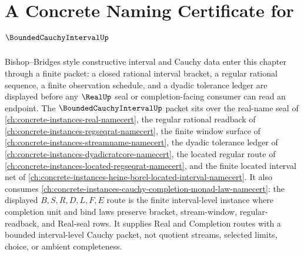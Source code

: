 \chapter{A Concrete Naming Certificate for $\BoundedCauchyIntervalUp$}
\label{ch:concrete-instances-bounded-cauchy-interval-namecert}

Bishop--Bridges style constructive interval and Cauchy data enter this chapter through a finite packet: a closed rational interval bracket, a regular rational sequence, a finite observation schedule, and a dyadic tolerance ledger are displayed before any $\RealUp$ seal or completion-facing consumer can read an endpoint. The $\BoundedCauchyIntervalUp$ packet sits over the real-name seal of \autoref{ch:concrete-instances-real-namecert}, the regular rational readback of \autoref{ch:concrete-instances-regseqrat-namecert}, the finite window surface of \autoref{ch:concrete-instances-streamname-namecert}, the dyadic tolerance ledger of \autoref{ch:concrete-instances-dyadicratcore-namecert}, the located regular route of \autoref{ch:concrete-instances-located-regseqrat-namecert}, and the finite located interval net of \autoref{ch:concrete-instances-heine-borel-located-interval-namecert}. It also consumes \autoref{ch:concrete-instances-cauchy-completion-monad-law-namecert}: the displayed $B,S,R,D,L,F,E$ route is the finite interval-level instance where completion unit and bind laws preserve bracket, stream-window, regular-readback, and Real-seal rows. It supplies Real and Completion routes with a bounded interval-level Cauchy packet, not quotient streams, selected limits, choice, or ambient completeness.

